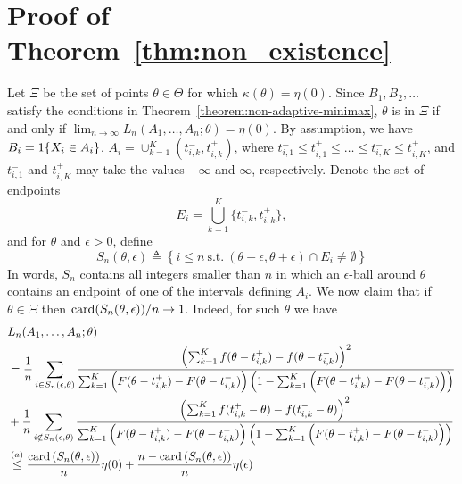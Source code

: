 
\section{Proof of Theorem~\ref{thm:non_existence}}
\label{proof:thm:non_existence}

Let $\Xi$ be the set of points $\theta \in \Theta$ for which $\kappa(\theta)
= \eta(0)$.
%
Since $B_1,B_2,\ldots$ satisfy the conditions in
Theorem~\ref{theorem:non-adaptive-minimax}, $\theta$ is in $\Xi$ if and only
if $\lim_{n\to \infty} L_n(A_1,\ldots,A_n;\theta) = \eta(0)$. By
assumption, we have $B_i = 1\!\left\{X_i \in A_i\right\}$, $A_i =
\cup_{k=1}^K (t^-_{i,k},t^+_{i,k})$, where $t^-_{i,1} \leq t^+_{i,1} \leq \ldots
\leq t^-_{i,K} \leq t^+_{i,K}$, and $t^-_{i,1}$ and $t^+_{i,K}$ may take the values
$-\infty$ and $\infty$, respectively. Denote the set of endpoints
\begin{equation*}
  E_i = \bigcup_{k=1}^{K}\{t^-_{i,k},t^+_{i,k}\},
\end{equation*}
and for $\theta$ and $\epsilon>0$, define
\begin{equation*}
  S_n(\theta, \epsilon) \triangleq \left\{ i\leq n ~ \mbox{s.t.}~
  (\theta-\epsilon,\theta+\epsilon) \cap E_i \neq \emptyset \right\}
\end{equation*}
In words, $S_n$ contains all integers smaller than $n$ in which an
$\epsilon$-ball around $\theta$ contains an endpoint of one of the intervals
defining $A_i$.
%
We now claim that 
if $\theta \in \Xi$ then $\mathrm{card}(S_n(\theta, \epsilon))/n \to 1$. Indeed, for such $\theta$ we have
\begin{align}
& L_n(A_1,\ldots,A_n; \theta) \nonumber \\
& = \frac{1}{n} \sum_{i \in S_n(\epsilon,\theta)}  
\frac{ \left(\sum_{k=1}^{K}  f(\theta - t^+_{i,k})- f(\theta - t^-_{i,k}) \right)^2}{ \sum_{k=1}^{K} \left( F(\theta - t^+_{i,k})- F(\theta - t^-_{i,k}) \right) \left(1-\sum_{k=1}^{K} \left( F(\theta - t^+_{i,k})- F(\theta - t^-_{i,k}) \right)\right)} \nonumber \\
& 
+ \frac{1}{n}\sum_{i \notin S_n(\epsilon,\theta) } \frac{ \left(\sum_{k=1}^{K}  f(t^+_{i,k}-\theta) - f(t^-_{i,k}-\theta) \right)^2} { \sum_{k=1}^{K} \left( F(\theta - t^+_{i,k})- F(\theta - t^-_{i,k}) \right) \left(1-\sum_{k=1}^{K} \left( F(\theta - t^+_{i,k})- F(\theta - t^-_{i,k}) \right)\right)} \nonumber \\
& \overset{(a)}{\leq}
\frac{\mathrm{card}\left(S_n(\theta,\epsilon)\right)}{n} \eta(0) + \frac{n-\mathrm{card}\left(S_n(\theta,\epsilon) \right) }{n} \eta(\epsilon) 
 \label{eq:non_existence_proof1}
\end{align}
